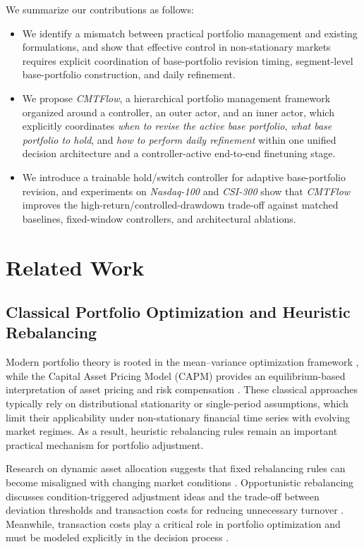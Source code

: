 \documentclass[letterpaper]{article} %
\begin{document}
We summarize our contributions as follows:
\begin{itemize}
    \item We identify a mismatch between practical portfolio management and existing formulations, and show that effective control in non-stationary markets requires explicit coordination of base-portfolio revision timing, segment-level base-portfolio construction, and daily refinement.
    \item We propose \textit{CMTFlow}, a hierarchical portfolio management framework organized around a controller, an outer actor, and an inner actor, which explicitly coordinates \emph{when to revise the active base portfolio}, \emph{what base portfolio to hold}, and \emph{how to perform daily refinement} within one unified decision architecture and a controller-active end-to-end finetuning stage.
    \item We introduce a trainable hold/switch controller for adaptive base-portfolio revision, and experiments on \textit{Nasdaq-100} and \textit{CSI-300} show that \textit{CMTFlow} improves the high-return/controlled-drawdown trade-off against matched baselines, fixed-window controllers, and architectural ablations.
\end{itemize}

\section{Related Work}
\subsection{Classical Portfolio Optimization and Heuristic Rebalancing}
Modern portfolio theory is rooted in the mean--variance optimization framework \citep{MVO}, while the Capital Asset Pricing Model (CAPM) provides an equilibrium-based interpretation of asset pricing and risk compensation \citep{CAMP}. These classical approaches typically rely on distributional stationarity or single-period assumptions, which limit their applicability under non-stationary financial time series with evolving market regimes. As a result, heuristic rebalancing rules remain an important practical mechanism for portfolio adjustment.

Research on dynamic asset allocation suggests that fixed rebalancing rules can become misaligned with changing market conditions \citep{Perold1988DynamicSF}. Opportunistic rebalancing discusses condition-triggered adjustment ideas and the trade-off between deviation thresholds and transaction costs for reducing unnecessary turnover \citep{9}. Meanwhile, transaction costs play a critical role in portfolio optimization and must be modeled explicitly in the decision process \citep{10}.
\end{document}
